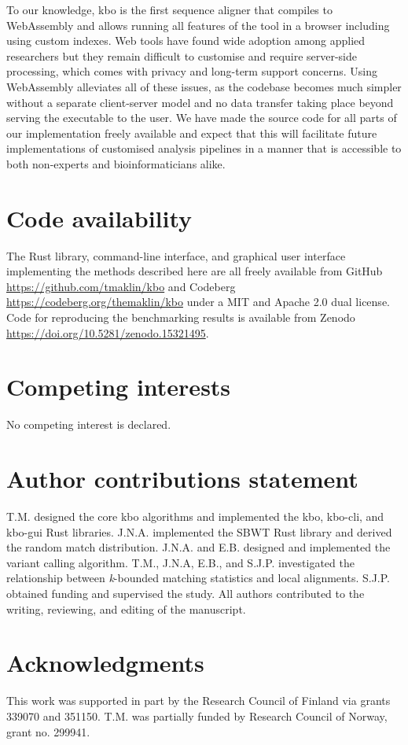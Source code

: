 \documentclass[unnumsec,webpdf,contemporary,large]{oup-authoring-template}%
\theoremstyle{thmstyleone}%
\theoremstyle{thmstyletwo}%
\theoremstyle{thmstylethree}%
\begin{document}
To our knowledge, {\sf kbo} is the first sequence aligner that compiles to WebAssembly and allows running all features of the tool in a browser including using custom indexes. Web tools have found wide adoption among applied researchers but they remain difficult to customise and require server-side processing, which comes with privacy and long-term support concerns. Using WebAssembly alleviates all of these issues, as the codebase becomes much simpler without a separate client-server model and no data transfer taking place beyond serving the executable to the user. We have made the source code for all parts of our implementation freely available and expect that this will facilitate future implementations of customised analysis pipelines in a manner that is accessible to both non-experts and bioinformaticians alike.


\section{Code availability}
The Rust library, command-line interface, and graphical user interface implementing the methods described here are all freely available from GitHub \url{https://github.com/tmaklin/kbo} and Codeberg \url{https://codeberg.org/themaklin/kbo} under a MIT and Apache 2.0 dual license. Code for reproducing the benchmarking results is available from Zenodo \url{https://doi.org/10.5281/zenodo.15321495}.

\section{Competing interests}
No competing interest is declared.

\section{Author contributions statement}
T.M. designed the core kbo algorithms and implemented the kbo, kbo-cli, and kbo-gui Rust libraries. J.N.A. implemented the SBWT Rust library and derived the random match distribution. J.N.A. and E.B. designed and implemented the variant calling algorithm. T.M., J.N.A, E.B., and S.J.P. investigated the relationship between \emph{k}-bounded matching statistics and local alignments. S.J.P. obtained funding and supervised the study. All authors contributed to the writing, reviewing, and editing of the manuscript.

\section{Acknowledgments}
This work was supported in part by the Research Council of Finland via grants 339070 and 351150. T.M. was partially funded by Research Council of Norway, grant no. 299941.

%
%






%
%
\end{document}
